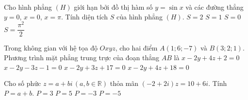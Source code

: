 \begin{ex}%
Cho hình phẳng $(H)$ giới hạn bởi đồ thị hàm số $y = \sin x$ và các đường thẳng $y=0$, $x=0$, $x = \pi$. Tính diện tích $S$ của hình phẳng $(H)$.
\choice
{\True $S = 2$}
{$S = 1$}
{$S = 0$}
{$S = \dfrac{\pi^2}{2}$}
\end{ex}

\begin{ex}%
Trong không gian với hệ tọa độ $Oxyz$, cho hai điểm $A(1;6;-7)$ và $B(3;2;1)$. Phương trình mặt phẳng trung trực của đoạn thẳng $AB$ là
\choice
{$x-2y+4z+2=0$}
{$x-2y-3z-1=0$}
{$x-2y+3z+17=0$}
{\True $x-2y+4z+18=0$}
\end{ex}

\begin{ex}%
Cho số phức $z = a+ bi\,(a,b \in \mathbb{R})$ thỏa mãn $(-2+2i)z = 10 + 6i$. Tính $P = a + b$.
\choice
{$P = 3$}
{$P = 5$}
{$P = -3$}
{\True $P = -5$}
\end{ex}

